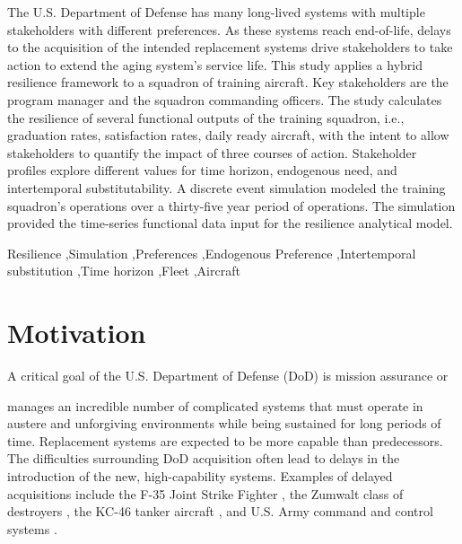 \documentclass[preprint,12pt]{elsarticle}
\begin{document}
\begin{frontmatter}
\begin{abstract}
\end{abstract}
The U.S. Department of Defense has many long-lived  systems with
multiple stakeholders with different preferences. As these systems
reach end-of-life, delays to the acquisition of the intended replacement systems drive
stakeholders to take action to extend the aging system's service life.
This study applies a hybrid resilience framework to a squadron of
training aircraft. Key stakeholders are the program manager and the
squadron commanding officers. The study calculates the resilience of
several functional outputs of the training squadron, i.e., graduation rates,
satisfaction rates, daily ready 
aircraft,  with the intent to allow stakeholders to quantify the
impact of three courses of action. Stakeholder profiles explore
different values for time horizon, endogenous need, and intertemporal
substitutability. %
A discrete event
simulation modeled the training squadron's operations over a
thirty-five year period of operations. The simulation provided the
time-series functional data input for the resilience analytical model.  

\begin{keyword}
Resilience \sep Simulation \sep Preferences \sep Endogenous Preference
\sep Intertemporal substitution \sep Time horizon \sep Fleet \sep Aircraft


\end{keyword}

\end{frontmatter}

\linenumbers

\section{Motivation}
\label{S:1}

A critical goal of the U.S. Department of Defense (DoD) is mission assurance or

manages an
incredible number of complicated systems that must operate in austere
and unforgiving environments while being sustained for long periods of
time. Replacement systems are expected to be more capable than
predecessors. The difficulties
surrounding DoD acquisition often lead to delays in 
the introduction of the new, high-capability systems. Examples of delayed acquisitions
include the F-35 Joint Strike Fighter
\cite{Werner2018}, the Zumwalt class of destroyers \cite{Katz2018},
the KC-46 tanker aircraft \cite{Mehta2016}, and U.S. Army command and
control systems \citep{Edwards2017}.
\end{document}
